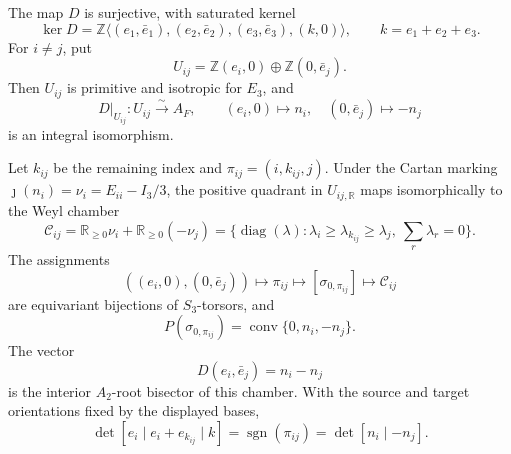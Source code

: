 \begin{theorem}
\label{rnmt:thm:pair-kuhn-weyl}
The map \(D\) is surjective, with saturated kernel
\begin{equation}
 \ker D
 =\mathbb Z\langle
 (e_1,\bar e_1),(e_2,\bar e_2),(e_3,\bar e_3),(k,0)\rangle,
 \qquad k=e_1+e_2+e_3.
 \label{rnmt:eq:D-kernel}
\end{equation}
For \(i\ne j\), put
\[
 U_{ij}=\mathbb Z(e_i,0)\oplus\mathbb Z(0,\bar e_j).
\]
Then \(U_{ij}\) is primitive and isotropic for \(E_3\), and
\begin{equation}
 D|_{U_{ij}}:U_{ij}\xrightarrow{\ \sim\ }A_F,\qquad
 (e_i,0)\longmapsto n_i,\quad(0,\bar e_j)\longmapsto-n_j
 \label{rnmt:eq:unimodular-plane}
\end{equation}
is an integral isomorphism.

Let \(k_{ij}\) be the remaining index and
\(\pi_{ij}=(i,k_{ij},j)\).  Under the Cartan marking
\(\jmath(n_i)=\nu_i=E_{ii}-I_3/3\), the positive quadrant in \(U_{ij,\mathbb
R}\) maps isomorphically to the Weyl chamber
\begin{equation}
 \mathcal C_{ij}
 =\mathbb R_{\geq0}\nu_i+\mathbb R_{\geq0}(-\nu_j)
 =\{\operatorname{diag}(\lambda):
 \lambda_i\geq\lambda_{k_{ij}}\geq\lambda_j,\
 \textstyle\sum_r\lambda_r=0\}.
 \label{rnmt:eq:chamber-inequalities}
\end{equation}
The assignments
\begin{equation}
 ((e_i,0),(0,\bar e_j))
 \longmapsto \pi_{ij}
 \longmapsto[\sigma_{0,\pi_{ij}}]
 \longmapsto\mathcal C_{ij}
 \label{rnmt:eq:torsor-chain}
\end{equation}
are equivariant bijections of \(S_3\)-torsors, and
\begin{equation}
 P(\sigma_{0,\pi_{ij}})
 =\operatorname{conv}\{0,n_i,-n_j\}.
 \label{rnmt:eq:projected-kuhn}
\end{equation}
The vector
\begin{equation}
 D(e_i,\bar e_j)=n_i-n_j
 \label{rnmt:eq:interior-root}
\end{equation}
is the interior \(A_2\)-root bisector of this chamber.  With the source and
target orientations fixed by the displayed bases,
\begin{equation}
 \det[e_i\mid e_i+e_{k_{ij}}\mid k]
 =\operatorname{sgn}(\pi_{ij})
 =\det[n_i\mid -n_j].
 \label{rnmt:eq:orientation-sign}
\end{equation}
\end{theorem}

